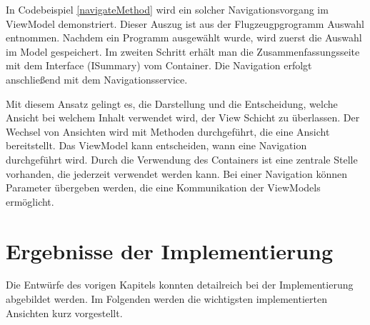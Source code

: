 In Codebeispiel \ref{navigateMethod} wird ein solcher Navigationsvorgang im ViewModel demonstriert. Dieser Auszug ist aus der Flugzeugpgrogramm Auswahl entnommen. Nachdem ein Programm ausgewählt wurde, wird zuerst die Auswahl im Model gespeichert. Im zweiten Schritt erhält man die  Zusammenfassungsseite mit dem Interface (ISummary) vom Container. Die Navigation erfolgt anschließend mit dem Navigationsservice.
\par
Mit diesem Ansatz gelingt es, die Darstellung und die Entscheidung, welche Ansicht bei welchem Inhalt verwendet wird, der View Schicht zu überlassen. Der Wechsel von Ansichten wird mit Methoden durchgeführt, die eine Ansicht bereitstellt. Das ViewModel kann entscheiden, wann eine Navigation durchgeführt wird. Durch die Verwendung des Containers ist eine zentrale Stelle vorhanden, die jederzeit verwendet werden kann. Bei einer Navigation können Parameter übergeben werden, die eine Kommunikation der ViewModels ermöglicht. 

\section{Ergebnisse der Implementierung}
Die Entwürfe des vorigen Kapitels konnten detailreich bei der Implementierung abgebildet werden. Im Folgenden werden die wichtigsten implementierten Ansichten kurz vorgestellt.

